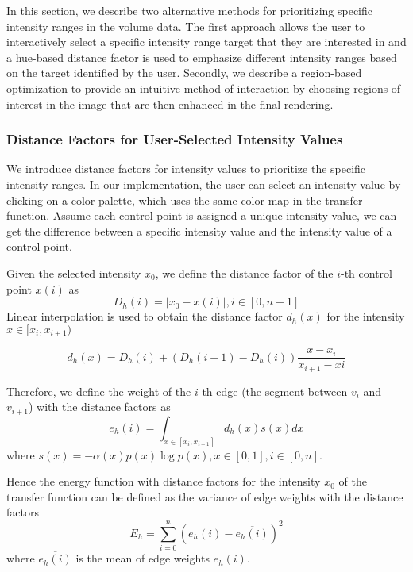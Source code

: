 In this section, we describe two alternative methods for prioritizing specific intensity ranges in the volume data. The first approach allows the user to interactively select a specific intensity range target that they are interested in and a hue-based distance factor is used to emphasize different intensity ranges based on the target identified by the user. Secondly, we describe a region-based optimization to provide an intuitive method of interaction by choosing regions of interest in the image that are then enhanced in the final rendering.

\subsubsection{Distance Factors for User-Selected Intensity Values}


We introduce distance factors for intensity values to prioritize the specific intensity ranges.
In our implementation, the user can select an intensity value by clicking on a color palette, which uses the same color map in the transfer function.
Assume each control point is assigned a unique intensity value, we can get the difference between a specific intensity value and the intensity value of a control point.

Given the selected intensity $ x_{0} $, we define the distance factor of the $ i $-th control point $ x(i) $ as
\[  D_{h}(i)=|x_{0}-x(i)|, i \in [0,n+1] \]
Linear interpolation is used to obtain the distance factor $ d_{h}(x) $ for the intensity $ x \in [x_{i},x_{i+1}) $

\[ d_{h}(x)=D_{h}(i) + (D_{h}(i+1)-D_{h}(i))\frac{x-x_{i}}{x_{i+1}-x{i}} \]

Therefore, we define the weight of the $ i $-th edge (the segment between $ v_{i} $ and $ v_{i+1} $) with the distance factors as
\[
e_{h}(i)=\int_{x \in [x_{i}, x_{i+1}]} d_{h}(x)s(x) dx
\]
where $ s(x)=-\alpha(x)p(x) \log p(x), x \in [0,1], i \in [0,n]$.

Hence the energy function with distance factors for the intensity $ x_{0} $ of the transfer function can be defined as the variance of edge weights with the distance factors
\[
E_{h}=\sum_{i=0}^{n}(e_{h}(i)-\overline{e_{h}(i)})^{2}
\]
where $ \overline{e_{h}(i)} $ is the mean of edge weights $e_{h}(i)$.

